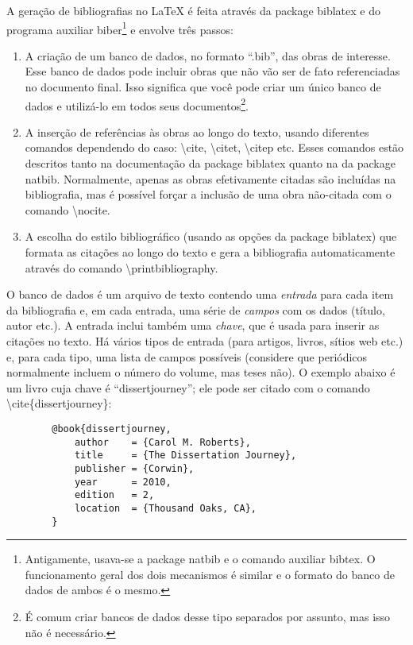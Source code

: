 A geração de bibliografias no \LaTeX{} é feita através da package
biblatex e do programa auxiliar
biber\footnote{Antigamente, usava-se a package
natbib e o comando auxiliar bibtex. O
funcionamento geral dos dois mecanismos é similar e o formato do banco de
dados de ambos é o mesmo.} e envolve três passos:

\begin{enumerate}
\item A criação de um banco de dados, no formato ``.bib'', das obras de
interesse. Esse banco de dados pode incluir obras que não vão ser de fato
referenciadas no documento final. Isso significa que você pode criar um
único banco de dados e utilizá-lo em todos seus documentos\footnote{É
comum criar bancos de dados desse tipo separados por assunto, mas isso
não é necessário.}.

\item A inserção de referências às obras ao longo do texto, usando
diferentes comandos dependendo do caso: \textsf{\textbackslash{}cite},
\textsf{\textbackslash{}citet}, \textsf{\textbackslash{}citep} etc. Esses
comandos estão descritos tanto na documentação da package
biblatex quanto na da package natbib.
Normalmente, apenas as obras efetivamente citadas são incluídas na
bibliografia, mas é possível forçar a inclusão de uma obra não-citada
com o comando \textsf{\textbackslash{}nocite}.

\item A escolha do estilo bibliográfico (usando as opções da package
biblatex) que formata as citações ao longo do texto e gera a bibliografia
automaticamente através do comando \textsf{\textbackslash{}printbibliography}.
\end{enumerate}

O banco de dados é um arquivo de texto contendo uma \emph{entrada} para cada
item da bibliografia e, em cada entrada, uma série de \emph{campos} com os
dados (título, autor etc.). A entrada inclui também uma \emph{chave}, que é
usada para inserir as citações no texto. Há vários tipos de entrada (para
artigos, livros, sítios web etc.) e, para cada tipo, uma lista de campos
possíveis (considere que periódicos normalmente incluem o número do volume,
mas teses não). O exemplo abaixo é um livro cuja chave é ``dissertjourney'';
ele pode ser citado com o comando \textsf{\textbackslash{}cite\{dissertjourney\}}:

\begin{verbatim}
        @book{dissertjourney,
            author    = {Carol M. Roberts},
            title     = {The Dissertation Journey},
            publisher = {Corwin},
            year      = 2010,
            edition   = 2,
            location  = {Thousand Oaks, CA},
        }
\end{verbatim}

